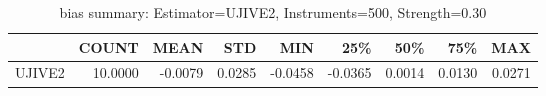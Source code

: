 \begin{table}[ht]
\centering
\caption{bias summary: Estimator=UJIVE2, Instruments=500, Strength=0.30}
\begin{tabular}{lrrrrrrrr}
\toprule
 & COUNT & MEAN & STD & MIN & 25\% & 50\% & 75\% & MAX \\
\midrule
UJIVE2 & 10.0000 & -0.0079 & 0.0285 & -0.0458 & -0.0365 & 0.0014 & 0.0130 & 0.0271 \\
\bottomrule
\end{tabular}
\end{table}
